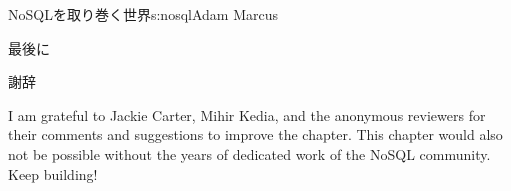 \begin{aosachapter}{NoSQLを取り巻く世界}{s:nosql}{Adam Marcus}
\begin{aosasect1}{最後に}
\end{aosasect1}

\begin{aosasect1}{謝辞}

I am grateful to Jackie Carter, Mihir Kedia, and the anonymous
reviewers for their comments and suggestions to improve the chapter.
This chapter would also not be possible without the years of dedicated
work of the NoSQL community.  Keep building!

\end{aosasect1}

\end{aosachapter}
